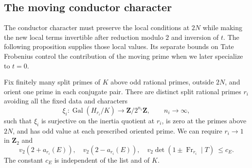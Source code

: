 \subsection{The moving conductor character}
\label{sec:h:conductor-direction}

The conductor character must preserve the local conditions at $2N$
while making the new local terms invertible after reduction modulo $2$
and inversion of $t$. The following proposition supplies those local
values. Its separate bounds on Tate Frobenius control the contribution
of the moving prime when we later specialize to $t=0$.

\begin{proposition}
\label{rl:characters}\label{lem:h:conductor-primes}
Fix finitely many split primes of $K$ above odd rational primes, outside
$2N$, and orient one prime in each conjugate pair.  There are distinct
split rational primes $r_i$ avoiding all the fixed data and characters
\[
 \xi_i:\operatorname{Gal}(H_{r_i}/K)\longrightarrow
                 \mathbf Z/2^{n_i}\mathbf Z,
 \qquad n_i\longrightarrow\infty,
\]
such that $\xi_i$ is surjective on the inertia quotient at $r_i$, is zero
at the primes above $2N$, and has odd value at each prescribed oriented
prime.  We can require $r_i\to1$ in $\mathbf Z_2$ and
\begin{equation}\label{eq:h:r-avoidance}
 v_2(2+a_{r_i}(E)),\quad v_2(2-a_{r_i}(E)),\quad
 v_2\det(1\pm\operatorname{Fr}_{r_i}\mid T)\ \leq c_E.
\end{equation}
The constant $c_E$ is independent of the list and of $K$.
\end{proposition}

